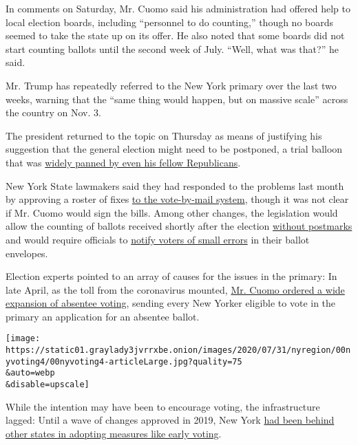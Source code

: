 In comments on Saturday, Mr. Cuomo said his administration had offered
help to local election boards, including ``personnel to do counting,''
though no boards seemed to take the state up on its offer. He also noted
that some boards did not start counting ballots until the second week of
July. ``Well, what was that?'' he said.

Mr. Trump has repeatedly referred to the New York primary over the last
two weeks, warning that the ``same thing would happen, but on massive
scale'' across the country on Nov. 3.

The president returned to the topic on Thursday as means of justifying
his suggestion that the general election might need to be postponed, a
trial balloon that was
\href{https://www.nytimes3xbfgragh.onion/2020/07/31/us/politics/trump-tweet-democracy.html}{widely
panned by even his fellow Republicans}.

New York State lawmakers said they had responded to the problems last
month by approving a roster of fixes
\href{https://www.nysenate.gov/newsroom/press-releases/senate-majority-advances-automatic-voter-registration-system-strengthens}{to
the vote-by-mail system}, though it was not clear if Mr. Cuomo would
sign the bills. Among other changes, the legislation would allow the
counting of ballots received shortly after the election
\href{https://www.nysenate.gov/legislation/bills/2019/s8799/amendment/a}{without
postmarks} and would require officials to
\href{https://www.nysenate.gov/legislation/bills/2019/s8370/amendment/b}{notify
voters of small errors} in their ballot envelopes.

Election experts pointed to an array of causes for the issues in the
primary: In late April, as the toll from the coronavirus mounted,
\href{https://www.governor.ny.gov/news/amid-ongoing-covid-19-pandemic-governor-cuomo-issues-executive-order-make-sure-every-new-yorker}{Mr.
Cuomo ordered a wide expansion of absentee voting}, sending every New
Yorker eligible to vote in the primary an application for an absentee
ballot.

\texttt{[image: https://static01.graylady3jvrrxbe.onion/images/2020/07/31/nyregion/00nyvoting4/00nyvoting4-articleLarge.jpg?quality=75\\\&auto=webp\\\&disable=upscale]}

While the intention may have been to encourage voting, the
infrastructure lagged: Until a wave of changes approved in 2019, New
York
\href{https://www.nytimes3xbfgragh.onion/2019/01/10/nyregion/voting-reform-election-ny.html}{had
been behind other states in adopting measures like early voting}.

